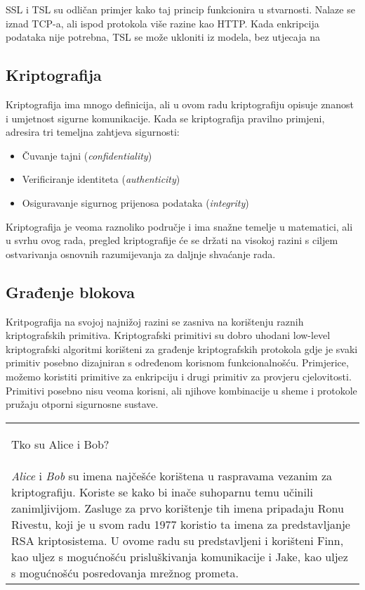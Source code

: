 \documentclass[times, utf8, diplomski]{fer}
\begin{document}
\medskip

SSL i TSL su odličan primjer kako taj princip funkcionira u stvarnosti. Nalaze se iznad TCP-a, ali ispod protokola više razine kao HTTP. Kada enkripcija podataka nije potrebna, TSL se može ukloniti iz modela, bez utjecaja na 


\subsection{Kriptografija}
Kriptografija ima mnogo definicija, ali u ovom radu kriptografiju opisuje znanost i umjetnost sigurne komunikacije. Kada se kriptografija pravilno primjeni, adresira tri temeljna zahtjeva sigurnosti:
\begin{itemize}
\item Čuvanje tajni (\textit{confidentiality})
\item Verificiranje identiteta (\textit{authenticity})
\item Osiguravanje sigurnog prijenosa podataka (\textit{integrity})
\end{itemize}

Kriptografija je veoma raznoliko područje i ima snažne temelje u matematici, ali u svrhu ovog rada, pregled kriptografije će se držati na visokoj razini s ciljem ostvarivanja osnovnih razumijevanja za daljnje shvaćanje rada.

\subsection{Građenje blokova}
Kritpografija na svojoj najnižoj razini se zasniva na korištenju raznih kriptografskih primitiva. Kriptografski primitivi su dobro uhodani low-level kriptografski algoritmi korišteni za građenje kriptografskih protokola gdje je svaki primitiv posebno dizajniran s određenom korisnom funkcionalnošću. Primjerice, možemo koristiti primitive za enkripciju i drugi primitiv za provjeru cjelovitosti. Primitivi posebno nisu veoma korisni, ali njihove kombinacije u sheme i protokole pružaju otporni sigurnosne sustave.

\bigskip
\medskip
\begin{center}
\begin{tabularx}{\textwidth}{|X|}
\hline
\begin{center}\Large \centering Tko su Alice i Bob?\end{center} \\
\textit{Alice} i \textit{Bob} su imena najčešće korištena u raspravama vezanim za kriptografiju. Koriste se kako bi inače suhoparnu temu učinili zanimljivijom. Zasluge za prvo korištenje tih imena pripadaju Ronu Rivestu, koji je u svom radu 1977 koristio ta imena za predstavljanje RSA kriptosistema. U ovome radu su predstavljeni i korišteni Finn, kao uljez s mogućnošću prisluškivanja komunikacije i Jake, kao uljez s mogućnošću posredovanja mrežnog prometa.\\
\hline
\end{tabularx}
\end{center}
\end{document}
